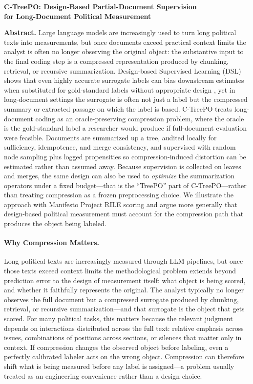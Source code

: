 \documentclass[11pt]{article}
\begin{document}
\begin{center}
{\Large \textbf{C-TreePO: Design-Based Partial-Document Supervision\\ for Long-Document Political Measurement}\par}
\end{center}

\textbf{Abstract.} Large language models are increasingly used to turn long political texts into measurements, but once documents exceed practical context limits the analyst is often no longer observing the original object: the substantive input to the final coding step is a compressed representation produced by chunking, retrieval, or recursive summarization. Design-based Supervised Learning (DSL) shows that even highly accurate surrogate labels can bias downstream estimates when substituted for gold-standard labels without appropriate design \citep{EgamiEtAl2024}, yet in long-document settings the surrogate is often not just a label but the compressed summary or extracted passage on which the label is based. C-TreePO treats long-document coding as an oracle-preserving compression problem, where the oracle is the gold-standard label a researcher would produce if full-document evaluation were feasible. Documents are summarized up a tree, audited locally for sufficiency, idempotence, and merge consistency, and supervised with random node sampling plus logged propensities so compression-induced distortion can be estimated rather than assumed away. Because supervision is collected on leaves and merges, the same design can also be used to \emph{optimize} the summarization operators under a fixed budget---that is the ``TreePO'' part of C-TreePO---rather than treating compression as a frozen preprocessing choice. We illustrate the approach with Manifesto Project RILE scoring \citep{ManifestoProject2025a} and argue more generally that design-based political measurement must account for the compression path that produces the object being labeled.

\paragraph{Why Compression Matters.}
Long political texts are increasingly measured through LLM pipelines, but once those texts exceed context limits the methodological problem extends beyond prediction error to the design of measurement itself: what object is being scored, and whether it faithfully represents the original. The analyst typically no longer observes the full document but a compressed surrogate produced by chunking, retrieval, or recursive summarization---and that surrogate is the object that gets scored. For many political tasks, this matters because the relevant judgment depends on interactions distributed across the full text: relative emphasis across issues, combinations of positions across sections, or silences that matter only in context. If compression changes the observed object before labeling, even a perfectly calibrated labeler acts on the wrong object. Compression can therefore shift what is being measured before any label is assigned---a problem usually treated as an engineering convenience rather than a design choice.
\end{document}
